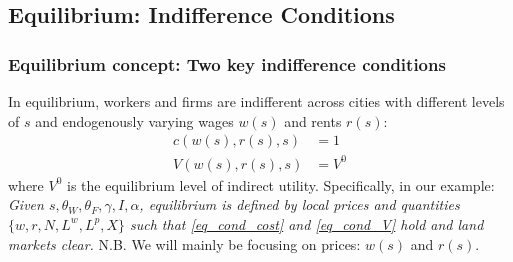 \documentclass[11pt,notes=hide,aspectratio=169]{beamer}
\begin{document}
\subsection{Equilibrium: Indifference Conditions}
\begin{frame}
\frametitle{Equilibrium concept: Two key indifference conditions}
 In equilibrium, workers and firms are indifferent across cities with different levels of $s$ and endogenously varying wages $w(s)$ and rents $r(s)$:
\begin{align} 
c(w(s), r(s), s) &= 1 \label{eq_cond_cost} \\
V(w(s), r(s), s) &= V^0 \label{eq_cond_V}
\end{align}
where $V^0$ is the equilibrium level of indirect utility.
\bigskip
Specifically, in our example: \\
\textit{Given $s,\theta_W, \theta_F, \gamma, I, \alpha$, equilibrium is defined by local prices and quantities $\{w,r,N,L^w,L^p,X\}$ such that \eqref{eq_cond_cost} and \eqref{eq_cond_V} hold and land markets clear.}
\bigskip
N.B. We will mainly be focusing on prices: $w(s)$ and $r(s)$.
\end{frame}
\end{document}
